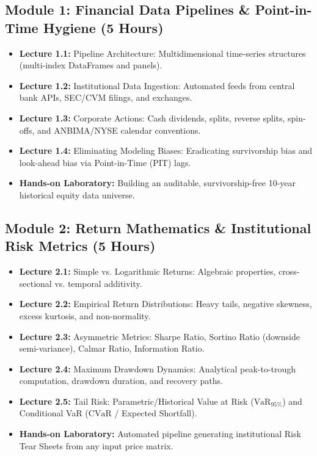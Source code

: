 \documentclass[11pt,a4paper]{article}
\begin{document}
\subsection*{Module 1: Financial Data Pipelines \& Point-in-Time Hygiene (5 Hours)}
\begin{itemize}[leftmargin=1.5em]
    \item \textbf{Lecture 1.1:} Pipeline Architecture: Multidimensional time-series structures (multi-index DataFrames and panels).
    \item \textbf{Lecture 1.2:} Institutional Data Ingestion: Automated feeds from central bank APIs, SEC/CVM filings, and exchanges.
    \item \textbf{Lecture 1.3:} Corporate Actions: Cash dividends, splits, reverse splits, spin-offs, and ANBIMA/NYSE calendar conventions.
    \item \textbf{Lecture 1.4:} Eliminating Modeling Biases: Eradicating survivorship bias and look-ahead bias via Point-in-Time (PIT) lags.
    \item \textbf{Hands-on Laboratory:} Building an auditable, survivorship-free 10-year historical equity data universe.
\end{itemize}

\subsection*{Module 2: Return Mathematics \& Institutional Risk Metrics (5 Hours)}
\begin{itemize}[leftmargin=1.5em]
    \item \textbf{Lecture 2.1:} Simple vs. Logarithmic Returns: Algebraic properties, cross-sectional vs. temporal additivity.
    \item \textbf{Lecture 2.2:} Empirical Return Distributions: Heavy tails, negative skewness, excess kurtosis, and non-normality.
    \item \textbf{Lecture 2.3:} Asymmetric Metrics: Sharpe Ratio, Sortino Ratio (downside semi-variance), Calmar Ratio, Information Ratio.
    \item \textbf{Lecture 2.4:} Maximum Drawdown Dynamics: Analytical peak-to-trough computation, drawdown duration, and recovery paths.
    \item \textbf{Lecture 2.5:} Tail Risk: Parametric/Historical Value at Risk ($\text{VaR}_{95\%}$) and Conditional VaR ($\text{CVaR}$ / Expected Shortfall).
    \item \textbf{Hands-on Laboratory:} Automated pipeline generating institutional Risk Tear Sheets from any input price matrix.
\end{itemize}
\end{document}
